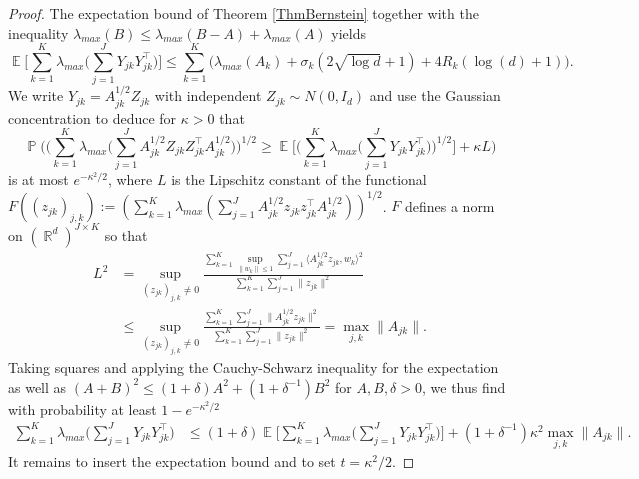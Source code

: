 \documentclass[preprint,aos]{imsart}
\numberwithin{equation}{section}
\theoremstyle{remark}
\DeclareMathOperator{\E}{{\mathbb E}}
\DeclareMathOperator{\R}{{\mathbb R}}
\DeclareMathOperator{\PP}{{\mathbb P}}
\DeclareMathOperator{\trace}{trace}
\providecommand{\norm}[1]{\lVert #1 \rVert}
\providecommand{\scapro}[2]{\langle #1,#2 \rangle}
\renewcommand{\le}{\leqslant}
\renewcommand{\ge}{\geqslant}
\providecommand{\mr}{\color{blue}}
\begin{document}
\begin{appendix}
\begin{proof}
The expectation bound of Theorem \ref{ThmBernstein} together with the inequality $\lambda_{max}(B)\le \lambda_{max}(B-A)+\lambda_{max}(A)$ yields
\[ \E\Big[\sum_{k=1}^K\lambda_{max}\Big(\sum_{j=1}^J Y_{jk}Y_{jk}^\top\Big)\Big]\le \sum_{k=1}^K\Big(\lambda_{max}(A_k)+\sigma_k(2\sqrt{\log d}+1)+4R_k(\log(d)+1)\Big).
\]
We write $Y_{jk}=A_{jk}^{1/2}Z_{jk}$ with independent $Z_{jk}\sim N(0,I_d)$  and use the Gaussian concentration \citep[Equation (1.6)]{LedouxTal1991} to deduce for $\kappa>0$ that
\[ \PP\Big(\Big(\sum_{k=1}^K\lambda_{max}\Big(\sum_{j= 1}^J A_{jk}^{1/2}Z_{jk}Z_{jk}^\top A_{jk}^{1/2}\Big)\Big)^{1/2}\ge \E\Big[\Big(\sum_{k=1}^K\lambda_{max}\Big(\sum_{j= 1}^J Y_{jk}Y_{jk}^\top\Big)\Big)^{1/2}\Big]+\kappa L\Big)
\]
is at most $e^{-\kappa^2/2}$, where $L$ is the Lipschitz constant of the functional $F((z_{jk})_{j,k}):=(\sum_{k=1}^K\lambda_{max}(\sum_{j= 1}^J A_{jk}^{1/2}z_{jk}z_{jk}^\top A_{jk}^{1/2}))^{1/2}$. $F$ defines a norm on $(\R^d)^{J\times K}$ so that
\begin{align*}
L^2&=\sup_{(z_{jk})_{j,k}\not=0} \frac{\sum_{k=1}^K\sup_{\norm{w_k}\le 1}\sum_{j= 1}^J \scapro{A_{jk}^{1/2}z_{jk}}{w_k}^2} {\sum_{k=1}^K\sum_{j=1}^J \norm{z_{jk}}^2}\\
&\le \sup_{(z_{jk})_{j,k}\not=0} \frac{\sum_{k=1}^K\sum_{j= 1}^J \norm{{A_{jk}^{1/2}z_{jk}}}^2} {\sum_{k=1}^K\sum_{j=1}^J \norm{z_{jk}}^2}= \max_{j,k}\norm{A_{jk}}.
\end{align*}
Taking squares and applying the Cauchy-Schwarz inequality for the expectation as well as $(A+B)^2\le (1+\delta)A^2+(1+\delta^{-1})B^2$ for $A,B,\delta>0$, we thus find with probability at least $1-e^{-\kappa^2/2}$
\begin{align*}
\sum_{k=1}^K\lambda_{max}\Big(\sum_{j= 1}^J Y_{jk}Y_{jk}^\top\Big)&\le  (1+\delta)\E\Big[\sum_{k=1}^K\lambda_{max}\Big(\sum_{j=1}^J Y_{jk}Y_{jk}^\top\Big)\Big]+ (1+\delta^{-1})\kappa^2\max_{j,k}\norm{A_{jk}}.
\end{align*}
It remains to insert the expectation bound and to set $t=\kappa^2/2$.
\begin{comment}
The classical Cram\'er-Chernoff method, the more precise inequality $\trace(\exp(S))\ge d-1+\exp(\lambda_{max}(S))$ for {\mr positive!} symmetric matrices $S$, the master  tail bound  \citep{tropp2012} and $\log(1+d(e^x-1))\le dx$, $x\ge 0$, yield by independence over $k$ and $j$
\begin{align*}
&\PP\Big(\sum_{k=1}^K\lambda_{max}\Big(\sum_{j\ge 1} (Y_{jk}Y_{jk}^\top-A_{jk})\Big)\ge t\Big) \\

\end{comment}
\end{proof}
\end{appendix}
\end{document}
